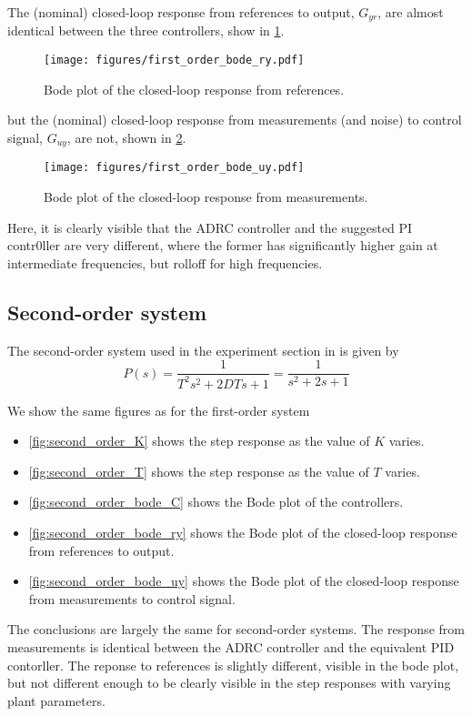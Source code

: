 \documentclass[letterpaper, 10 pt, conference]{ieeeconf}
\begin{document}
The (nominal) closed-loop response from references to output, $G_{yr}$, are almost identical between the three controllers, show in \cref{fig:first_order_bode_ry}.
\begin{figure}[h]
	\centering
	\texttt{[image: figures/first\_order\_bode\_ry.pdf]}
	\caption{Bode plot of the closed-loop response from references.}
	\label{fig:first_order_bode_ry}
\end{figure}

but the (nominal) closed-loop response from measurements (and noise) to control signal, $G_{uy}$, are not, shown in \cref{fig:first_order_bode_uy}.
\begin{figure}[h]
	\centering
	\texttt{[image: figures/first\_order\_bode\_uy.pdf]}
	\caption{Bode plot of the closed-loop response from measurements.}
	\label{fig:first_order_bode_uy}
\end{figure}
Here, it is clearly visible that the ADRC controller and the suggested PI contr0ller are very different, where the former has significantly higher gain at intermediate frequencies, but rolloff for high frequencies.

\subsection{Second-order system}
The second-order system used in the experiment section in \cite{herbst2013simulative} is given by
$$P(s) = \dfrac{1}{T^2s^2 + 2DTs + 1} = \dfrac{1}{s^2 + 2s + 1}$$

We show the same figures as for the first-order system
\begin{itemize}
	\item \cref{fig:second_order_K} shows the step response as the value of $K$ varies.
	\item \cref{fig:second_order_T} shows the step response as the value of $T$ varies.
	\item \cref{fig:second_order_bode_C} shows the Bode plot of the controllers.
	\item \cref{fig:second_order_bode_ry} shows the Bode plot of the closed-loop response from references to output.
	\item \cref{fig:second_order_bode_uy} shows the Bode plot of the closed-loop response from measurements to control signal.
\end{itemize}
The conclusions are largely the same for second-order systems. The response from measurements is identical between the ADRC controller and the equivalent PID contorller. The reponse to references is slightly different, visible in the bode plot, but not different enough to be clearly visible in the step responses with varying plant parameters.
\end{document}

